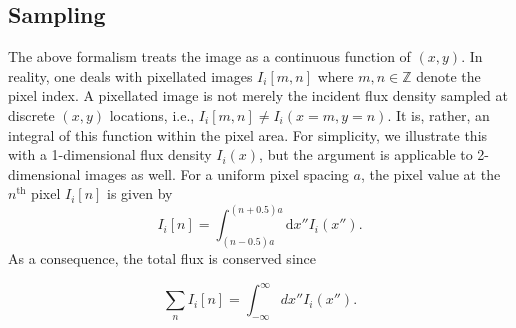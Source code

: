 \documentclass{openjournal}
\newcommand{\irresponse}[1]{{#1}}
\begin{document}
\subsection{Sampling}
\label{sec:sampling}
The above formalism treats the image as a continuous function of $(x,y)$.  In reality, one deals with pixellated images $I_i[m, n]$ where $m, n \in \mathbb{Z}$ denote the pixel index. A pixellated image is not \irresponse{merely the incident flux density} sampled at discrete $(x, y)$ locations, i.e., $I_i[m, n] \ne I_i(x=m, y=n)$. It is, rather, an integral of \irresponse{this function} within the pixel area. For simplicity, we illustrate this with a 1-dimensional \irresponse{flux density} $I_i(x)$, but the argument is applicable to 2-dimensional images as well.
For a uniform pixel spacing $a$, the pixel value at the $n^\text{th}$ pixel $I_i[n]$ is given by
\begin{equation}
    I_i[n] = \int_{(n-0.5)a}^{(n+0.5)a} \mathrm{d}x'' I_i(x'').
    \label{eq:pixellated_image}
\end{equation}
As a consequence, the total flux is conserved since
\begin{linenomath}\begin{equation}
    \sum_n I_i[n] = \int_{-\infty}^{\infty} dx'' I_i(x'').
\end{equation}\end{linenomath}
\end{document}
